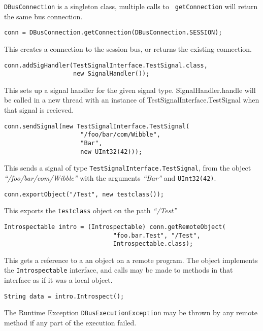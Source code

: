 \documentclass[a4paper,12pt]{article}
\begin{document}
{\tt DBusConnection} is a singleton class, multiple calls to {\tt
getConnection} will return the same bus connection. 

\begin{verbatim}
conn = DBusConnection.getConnection(DBusConnection.SESSION);
\end{verbatim}

This creates a connection to the session bus, or returns the
existing connection.

\begin{verbatim}
conn.addSigHandler(TestSignalInterface.TestSignal.class,
                   new SignalHandler());
\end{verbatim}

This sets up a signal handler for the given signal type.
SignalHandler.handle will be called in a new thread with an instance
of TestSignalInterface.TestSignal when that signal is recieved.

\begin{verbatim}
conn.sendSignal(new TestSignalInterface.TestSignal(
                     "/foo/bar/com/Wibble", 
                     "Bar", 
                     new UInt32(42)));
\end{verbatim}

This sends a signal of type {\tt TestSignalInterface.TestSignal},
from the object {\em ``/foo/bar/com/Wibble''} with the arguments {\em
``Bar''} and {\tt UInt32(42)}.

\begin{verbatim}
conn.exportObject("/Test", new testclass());
\end{verbatim}

This exports the {\tt testclass} object on the path {\em ``/Test''}

\begin{verbatim}
Introspectable intro = (Introspectable) conn.getRemoteObject(
                              "foo.bar.Test", "/Test",
                              Introspectable.class);
\end{verbatim}

This gets a reference to a an object on a remote program. The object
implements the {\tt Introspectable} interface, and calls may be made
to methods in that interface as if it was a local object.

\begin{verbatim}
String data = intro.Introspect();
\end{verbatim}

The Runtime Exception {\tt DBusExecutionException} may be thrown
by any remote method if any part of the execution failed.
\end{document}
